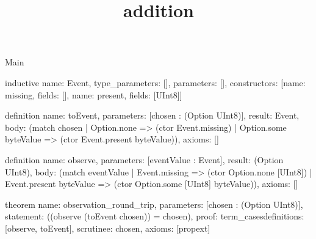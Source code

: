\begin{lexlean}{Main}
\title{addition}
\begin{semanticmodule}
inductive{
  name: Event,
  type_parameters: [],
  parameters: [],
  constructors: [{name: missing, fields: []}, {name: present, fields: [UInt8]}]
}

definition{
  name: toEvent,
  parameters: [chosen : (Option UInt8)],
  result: Event,
  body: (match chosen
    | Option.none => (ctor Event.missing)
    | Option.some byteValue => (ctor Event.present byteValue)),
  axioms: []
}

definition{
  name: observe,
  parameters: [eventValue : Event],
  result: (Option UInt8),
  body: (match eventValue
    | Event.missing => (ctor Option.none [UInt8])
    | Event.present byteValue => (ctor Option.some [UInt8] byteValue)),
  axioms: []
}

theorem{
  name: observation_round_trip,
  parameters: [chosen : (Option UInt8)],
  statement: ((observe (toEvent chosen)) = chosen),
  proof: term_cases{definitions: [observe, toEvent], scrutinee: chosen},
  axioms: [propext]
}
\end{semanticmodule}
\end{lexlean}
